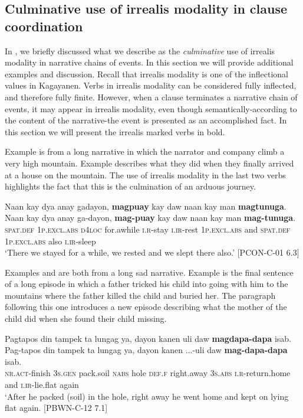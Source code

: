 \subsection{Culminative use of irrealis modality in clause coordination}
\label{sec:culminativeuse}
In ,  we briefly discussed what we describe as the \textit{culminative} use of irrealis modality in narrative chains of events. In this section we will provide additional examples and discussion. Recall that irrealis modality is one of the inflectional values in Kagayanen. Verbs in irrealis modality can be considered fully inflected, and therefore fully finite. However, when a clause terminates a narrative chain of events, it may appear in irrealis modality, even though semantically-according to the content of the narrative-the event is presented as an accomplished fact. In this section we will present the irrealis marked verbs in bold.

Example  is from a long narrative in which the narrator and company climb a very high mountain. Example  describes what they did when they finally arrived at a house on the mountain. The use of irrealis modality in the last two verbs highlights the fact that this is the culmination of an arduous journey.

\ea
\label{ex:weslepttherealso}
Naan kay dya anay gadayon, \textbf{magpuay} kay daw naan kay man \textbf{magtunuga}.\\\smallskip
\gll Naan kay dya anay ga-dayon, \textbf{mag-puay} kay daw naan kay man \textbf{mag-tunuga}. \\
\textsc{spat.def} 1\textsc{p.excl.abs} \textsc{d4loc} for.awhile \textsc{i.r}-stay \textsc{i.ir}-rest 1\textsc{p.excl.abs} and \textsc{spat.def} 1\textsc{p.excl.abs} also \textsc{i.ir}-sleep \\
\glt ‘There we stayed for a while, we rested and we slept there also.’ [PCON-C-01 6.3]
\z

Examples  and  are both from a long sad narrative. Example  is the final sentence of a long episode in which a father tricked his child into going with him to the mountains where the father killed the child and buried her. The paragraph following this one introduces a new episode describing what the mother of the child did when she found their child missing.

\ea
\label{ex:lyingflatagain}
Pagtapos din tampek ta lungag ya, dayon kanen uli daw \textbf{magdapa-dapa} isab.\\\smallskip
\gll Pag-tapos din tampek ta lungag ya, dayon kanen ...-uli daw \textbf{mag-dapa-dapa} isab. \\
\textsc{nr.act}-finish 3\textsc{s.gen} pack.soil \textsc{nabs} hole \textsc{def.f} right.away 3\textsc{s.abs} \textsc{i.r}-return.home and \textsc{i.ir}-lie.flat again\\
\glt ‘After he packed (soil) in the hole, right away he went home and kept on lying flat again. [PBWN-C-12 7.1]
\z

